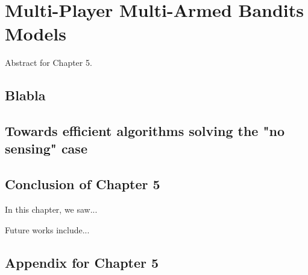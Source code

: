 
\chapter{Multi-Player Multi-Armed Bandits Models}
\label{chapter:5}
\minitoc

Abstract for Chapter 5.

\newpage
\graphicspath{{2-Chapters/5-Chapter/Images/}}
\graphicspath{{2-Chapters/5-Chapter/ALT_2018__MPBandits.git/figures/}}

\section{Blabla}
\label{sec:blabla}





\section{Towards efficient algorithms solving the "no sensing" case}
\label{sec:5:XXX}



\section{Conclusion of Chapter 5}
\label{sec:5:conclusion}

In this chapter, we saw...

Future works include...



\section{Appendix for Chapter 5}
\label{sec:5:appendix}



